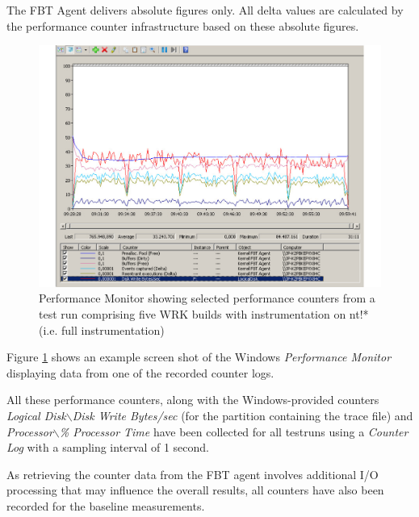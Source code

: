 The FBT Agent delivers absolute figures only. All delta values are calculated by the performance
counter infrastructure based on these absolute figures.

\begin{figure}[htbp] 
\begin{centering} 
\includegraphics[scale=0.5]{images/PerfmonRun.pdf} 
\caption[Performance Monitor showing selected performance counters]{Performance Monitor showing selected performance counters from a test run comprising five WRK builds with instrumentation on nt!* (i.e. full instrumentation)} 
\label{PerfmonRun} 
\end{centering} 
\end{figure}

Figure \ref{PerfmonRun} shows an example screen shot of the Windows 
\emph{Performance Monitor} displaying data from one of the recorded counter logs. 


All these performance counters, along with the Windows-provided counters 
\emph{Logical Disk$\backslash$Disk Write Bytes/sec} (for the partition containing the trace file) and \emph{Processor$\backslash$\% Processor Time} have been collected for all testruns using a 
\emph{Counter Log} with a sampling interval of 1 second.

As retrieving the counter data from the FBT agent involves additional I/O processing 
that may influence the overall results, all counters have also been recorded for the 
baseline measurements.

